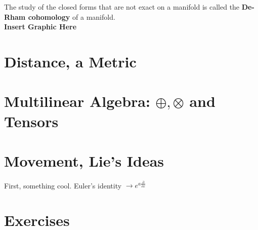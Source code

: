 	The study of the closed forms that are not exact on a manifold is called the \textbf{De-Rham cohomology} of a manifold. \\
	
	\textbf{Insert Graphic Here}
	
	
	\section{Distance, a Metric}	
	
	
	\section[Multilinear Algebra: $\oplus, \otimes$ and Tensors]{Multilinear Algebra: $\oplus, \otimes$ and\\ Tensors}

	\section{Movement, Lie's Ideas}

		First, something cool. Euler's identity $\rightarrow e^{a \frac{\partial}{\partial x}}$

	\section{Exercises}
	
